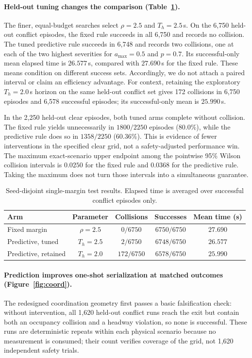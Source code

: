 \paragraph{Held-out tuning changes the comparison (Table~\ref{tab:heldout-single}).}
The finer, equal-budget searches select $\rho=2.5$ and $T_h=2.5$\,s. On the 6,750 held-out conflict episodes, the fixed rule succeeds in all 6,750 and records no collision. The tuned predictive rule succeeds in 6,748 and records two collisions, one at each of the two highest severities for $a_{\max}=0.5$ and $p=0.7$. Its successful-only mean elapsed time is $26.577$\,s, compared with $27.690$\,s for the fixed rule. These means condition on different success sets. Accordingly, we do not attach a paired interval or claim an efficiency advantage. For context, retaining the exploratory $T_h=2.0$\,s horizon on the same held-out conflict set gives 172 collisions in 6,750 episodes and 6,578 successful episodes; its successful-only mean is $25.990$\,s.

In the 2,250 held-out clear episodes, both tuned arms complete without collision. The fixed rule yields unnecessarily in $1800/2250$ episodes (80.0\%), while the predictive rule does so in $1358/2250$ (60.36\%). This is evidence of fewer interventions in the specified clear grid, not a safety-adjusted performance win. The maximum exact-scenario upper endpoint among the pointwise 95\% Wilson collision intervals is $0.0250$ for the fixed rule and $0.0368$ for the predictive rule. Taking the maximum does not turn those intervals into a simultaneous guarantee.

\begin{table}[tbp]
\centering
\small
\caption{Seed-disjoint single-margin test results. Elapsed time is averaged over successful conflict episodes only.}
\label{tab:heldout-single}
\begin{tabular}{lcccc}
\toprule
Arm & Parameter & Collisions & Successes & Mean time (s) \\
\midrule
Fixed margin & $\rho=2.5$ & $0/6750$ & $6750/6750$ & $27.690$ \\
Predictive, tuned & $T_h=2.5$ & $2/6750$ & $6748/6750$ & $26.577$ \\
Predictive, retained & $T_h=2.0$ & $172/6750$ & $6578/6750$ & $25.990$ \\
\bottomrule
\end{tabular}
\end{table}

\paragraph{Prediction improves one-shot serialization at matched outcomes (Figure~\ref{fig:coord}).}
The redesigned coordination geometry first passes a basic falsification check: without intervention, all 1,620 held-out conflict runs reach the exit but contain both an occupancy collision and a headway violation, so none is successful. These runs are deterministic repeats within each physical scenario because no measurement is consumed; their count verifies coverage of the grid, not 1,620 independent safety trials.

